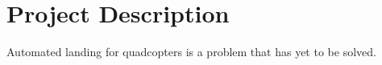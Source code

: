 \section*{Project Description}

Automated landing for quadcopters is a problem that has yet to be solved. 

